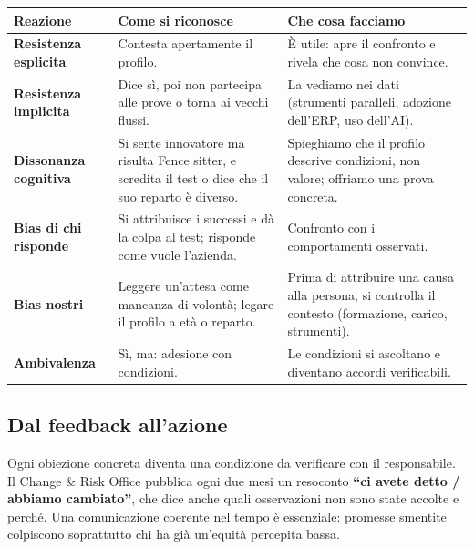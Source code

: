 \documentclass[11pt,a4paper]{article}
\begin{document}
{\small\renewcommand{\arraystretch}{1.25}
\begin{xltabular}{\linewidth}{@{}>{\raggedright\arraybackslash{}\hsize\hspace{0pt}}X>{\raggedright\arraybackslash{}\hsize\hspace{0pt}}X>{\raggedright\arraybackslash{}\hsize\hspace{0pt}}X@{}}
\toprule
\textbf{Reazione} & \textbf{Come si riconosce} & \textbf{Che cosa facciamo} \\
\midrule
\endhead
\textbf{Resistenza esplicita} & Contesta apertamente il profilo. & È utile: apre il confronto e rivela che cosa non convince. \\
\textbf{Resistenza implicita} & Dice sì, poi non partecipa alle prove o torna ai vecchi flussi. & La vediamo nei dati (strumenti paralleli, adozione dell'ERP, uso dell'AI). \\
\textbf{Dissonanza cognitiva} & Si sente innovatore ma risulta Fence sitter, e scredita il test o dice che il suo reparto è diverso. & Spieghiamo che il profilo descrive condizioni, non valore; offriamo una prova concreta. \\
\textbf{Bias di chi risponde} & Si attribuisce i successi e dà la colpa al test; risponde come vuole l'azienda. & Confronto con i comportamenti osservati. \\
\textbf{Bias nostri} & Leggere un'attesa come mancanza di volontà; legare il profilo a età o reparto. & Prima di attribuire una causa alla persona, si controlla il contesto (formazione, carico, strumenti). \\
\textbf{Ambivalenza} & \guillemotleft{}Sì, ma\guillemotright{}: adesione con condizioni. & Le condizioni si ascoltano e diventano accordi verificabili. \\
\bottomrule
\end{xltabular}}

\subsection{Dal feedback all'azione}\label{sec:7.3}
Ogni obiezione concreta diventa una condizione da verificare con il responsabile. Il Change \& Risk Office pubblica ogni due mesi un resoconto \textbf{``ci avete detto / abbiamo cambiato''}, che dice anche quali osservazioni non sono state accolte e perché. Una comunicazione coerente nel tempo è essenziale: promesse smentite colpiscono soprattutto chi ha già un'equità percepita bassa.
\end{document}

